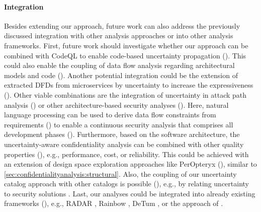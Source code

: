 \paragraph{Integration}
Besides extending our approach, future work can also address the previously discussed integration with other analysis approaches or into other analysis frameworks.
First, future work should investigate whether our approach can be combined with CodeQL \cite{github_codeql_2021,de_moor_ql_2008} to enable code-based uncertainty propagation ().
This could also enable the coupling of data flow analysis regarding architectural models and code \cite{reiche_modeling_2021,lochau_model-based_2012} ().
Another potential integration could be the extension of extracted \acp{DFD} from microservices \cite{schneider_automatic_2023} by uncertainty \cite{niehues_integrating_2024} to increase the expressiveness ().
Other viable combinations are the integration of uncertainty in attack path analysis \cite{walter_architecture-based_2023-1} () or other architecture-based security analyses \cite{katkalov_model-driven_2013,goos_umlsec_2002,lodderstedt_secureuml_2002} ().
Here, natural language processing can be used to derive data flow constraints from requirements () to enable a continuous security analysis that comprises all development phases \cite{schulz_continuous_2021} ().
Furthermore, based on the software architecture, the uncertainty-aware confidentiality analysis can be combined with other quality properties (), e.g., performance, cost, or reliability.
This could be achieved with an extension of design space exploration approaches like PerOpteryx \cite{koziolek_peropteryx_2011} (), similar to \autoref{sec:confidentialityanalysis:structural}.
Also, the coupling of our uncertainty catalog approach \arcen with other catalogs is possible (), e.g., by relating uncertainty to security solutions \cite{jasser_constraining_2019}.
Last, our analyses could be integrated into already existing frameworks (), e.g., RADAR \cite{busari_modelling_2019,busari_radar_2017}, Rainbow \cite{garlan_rainbow_2004}, DeTum \cite{famelis_managing_2019}, or the approach of \textcite{lytra_supporting_2013}.


